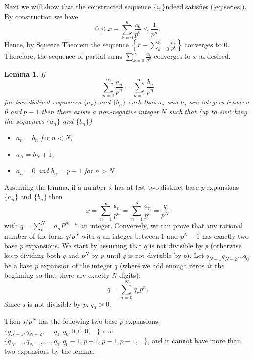 \documentclass[12pt]{article}
\newtheorem{lemma}{Lemma}
\newcommand\bi{\begin{itemize}}
\newcommand\ei{\end{itemize}}
\newcommand\itemb{\item[(b)]}
\renewcommand\|{\ | \ }
\def\sequence#1{$\{{#1}_n\}$}
\def\sumint#1{\sum_{#1=1}^\infty}
\begin{document}
Next we will show that the constructed sequence \sequence indeed satisfies
(\ref{eq:series}). By construction we have
\[
0 \leq x - \sum_{k=0}^{n} \frac{a_k}{p^k} \leq \frac 1 {p^n}.
\]
Hence, by Squeeze Theorem the sequence 
$\left\{x - \sum_{k=0}^{n} \frac{a_k}{p^k}\right\}$ converges to 0. Therefore,
the sequence of partial sums $\sum_{k=0}^{n} \frac{a_k}{p^k}$ converges to $x$ 
as desired.
\itemb
\begin{lemma}
\label{lem:two-expansions}
If
\[
\sumint n \frac {a_n}{p^n} = \sumint n \frac {b_n}{p^n}
\]
for two \emph{distinct} sequences \sequence a and \sequence b such that
$a_n$ and $b_n$ are integers between 0 and $p - 1$ then there exists a
non-negative integer $N$ such that (up to switching the sequences 
\sequence a and \sequence b)
\bi
\item
$a_n = b_n$ for $n < N$,
\item
$a_N = b_N + 1$,
\item
$a_n = 0$ and $b_n = p - 1$ for $n > N$.
\ei
\end{lemma}

Assuming the lemma, if a number $x$ has at lest two distinct base $p$
expansions \sequence a and \sequence b then
\[
x = \sumint n \frac{a_n}{p^n} = \sum_{n = 1}^N \frac{a_n}{p^n} = 
\frac{q}{p^N}
\]
with $q = \sum_{n = 1}^N a_nP^{N - n}$ an integer. Conversely, we can prove 
that any rational number of the form $q/p^N$ with $q$ an integer between  
1 and $p^N - 1$ has exactly two base $p$ expansions. We start by
assuming that $q$ is not divisible by $p$ (otherwise keep dividing both
$q$ and $p^N$ by $p$ until $q$ is not divisible by $p$).
Let $q_{N-1}q_{N-2}\ldots q_0$ be a base $p$ expansion of the integer $q$
(where we add enough zeros at the beginning so that there are exactly
$N$ digits):
\[
q = \sum_{n = 0}^N q_n p^n.
\]
Since $q$ is not divisible by $p$, $q_0 > 0$.

Then $q / p^N$ has the following two base $p$ expansions:
$\{q_{N-1}, q_{N-2}, \ldots, q_1, q_0, 0, 0, 0, \ldots\}$ and 
$\{q_{N-1}, q_{N-2}, \ldots, q_1, q_0 - 1, p - 1, p - 1, p - 1, \ldots\}$,
and it cannot have more than two expansions by the lemma.
\end{document}
